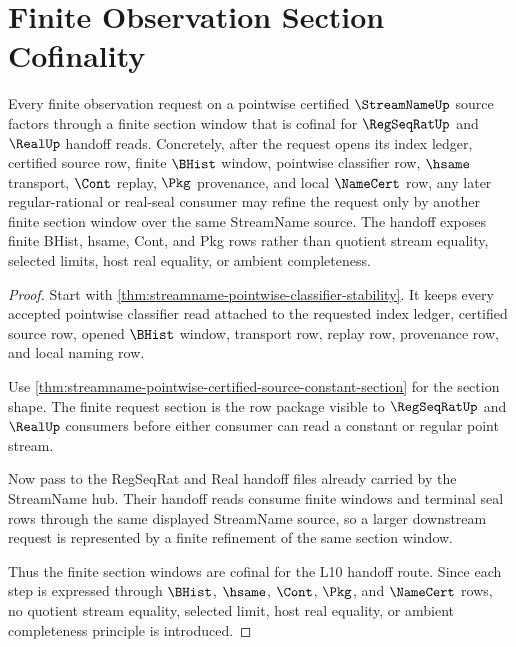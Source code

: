 \section{Finite Observation Section Cofinality}
\label{sec:streamname-finite-observation-section-cofinality}

\begin{theorem}
\label{thm:streamname-finite-observation-section-cofinality}
Every finite observation request on a pointwise certified $\StreamNameUp$ source factors through a finite section window that is cofinal for $\RegSeqRatUp$ and $\RealUp$ handoff reads. Concretely, after the request opens its index ledger, certified source row, finite $\BHist$ window, pointwise classifier row, $\hsame$ transport, $\Cont$ replay, $\Pkg$ provenance, and local $\NameCert$ row, any later regular-rational or real-seal consumer may refine the request only by another finite section window over the same StreamName source. The handoff exposes finite BHist, hsame, Cont, and Pkg rows rather than quotient stream equality, selected limits, host real equality, or ambient completeness.
\end{theorem}
\begin{proof}
Start with \autoref{thm:streamname-pointwise-classifier-stability}. It keeps every accepted pointwise classifier read attached to the requested index ledger, certified source row, opened $\BHist$ window, transport row, replay row, provenance row, and local naming row.

Use \autoref{thm:streamname-pointwise-certified-source-constant-section} for the section shape. The finite request section is the row package visible to $\RegSeqRatUp$ and $\RealUp$ consumers before either consumer can read a constant or regular point stream.

Now pass to the RegSeqRat and Real handoff files already carried by the StreamName hub. Their handoff reads consume finite windows and terminal seal rows through the same displayed StreamName source, so a larger downstream request is represented by a finite refinement of the same section window.

Thus the finite section windows are cofinal for the L10 handoff route. Since each step is expressed through $\BHist$, $\hsame$, $\Cont$, $\Pkg$, and $\NameCert$ rows, no quotient stream equality, selected limit, host real equality, or ambient completeness principle is introduced.
\end{proof}

